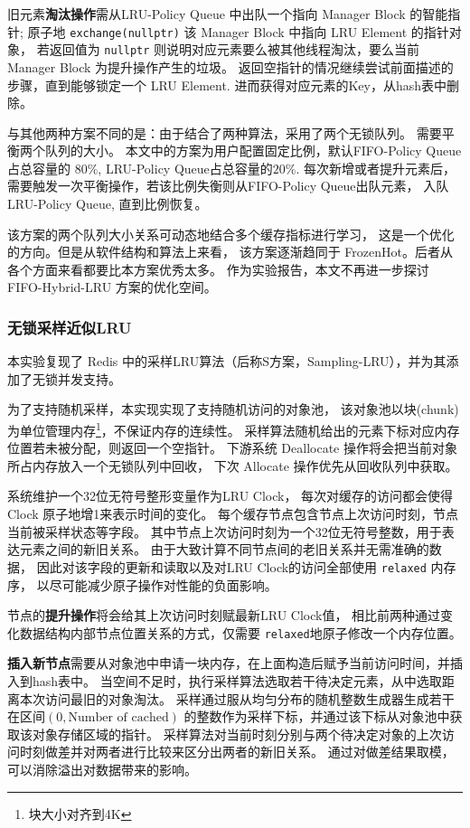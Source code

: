 旧元素\textbf{淘汰操作}需从LRU-Policy Queue 中出队一个指向 Manager Block 的智能指针;
原子地 \verb|exchange(nullptr)| 该 Manager Block 中指向 LRU Element 的指针对象，
若返回值为 \verb|nullptr| 则说明对应元素要么被其他线程淘汰，要么当前 Manager Block 为提升操作产生的垃圾。
返回空指针的情况继续尝试前面描述的步骤，直到能够锁定一个 LRU Element.
进而获得对应元素的Key，从hash表中删除。

与其他两种方案不同的是：由于结合了两种算法，采用了两个无锁队列。
需要平衡两个队列的大小。
本文中的方案为用户配置固定比例，默认FIFO-Policy Queue占总容量的 $80\%$,
LRU-Policy Queue占总容量的$20\%$. 每次新增或者提升元素后，
需要触发一次平衡操作，若该比例失衡则从FIFO-Policy Queue出队元素，
入队LRU-Policy Queue, 直到比例恢复。

该方案的两个队列大小关系可动态地结合多个缓存指标进行学习，
这是一个优化的方向。但是从软件结构和算法上来看，
该方案逐渐趋同于 FrozenHot。后者从各个方面来看都要比本方案优秀太多。
作为实验报告，本文不再进一步探讨 FIFO-Hybrid-LRU 方案的优化空间。

\subsubsection{无锁采样近似LRU}

本实验复现了 Redis 中的采样LRU算法（后称S方案，Sampling-LRU），并为其添加了无锁并发支持。

为了支持随机采样，本实现实现了支持随机访问的对象池，
该对象池以块(chunk)为单位管理内存\footnote{块大小对齐到4K}，不保证内存的连续性。
采样算法随机给出的元素下标对应内存位置若未被分配，则返回一个空指针。
下游系统 Deallocate 操作将会把当前对象所占内存放入一个无锁队列中回收，
下次 Allocate 操作优先从回收队列中获取。

系统维护一个32位无符号整形变量作为LRU Clock，
每次对缓存的访问都会使得Clock 原子地增1来表示时间的变化。
每个缓存节点包含节点上次访问时刻，节点当前被采样状态等字段。
其中节点上次访问时刻为一个32位无符号整数，用于表达元素之间的新旧关系。
由于大致计算不同节点间的老旧关系并无需准确的数据，
因此对该字段的更新和读取以及对LRU Clock的访问全部使用 \verb|relaxed| 内存序，
以尽可能减少原子操作对性能的负面影响。

节点的\textbf{提升操作}将会给其上次访问时刻赋最新LRU Clock值，
相比前两种通过变化数据结构内部节点位置关系的方式，仅需要 \verb|relaxed|地原子修改一个内存位置。

\textbf{插入新节点}需要从对象池中申请一块内存，在上面构造后赋予当前访问时间，并插入到hash表中。
当空间不足时，执行采样算法选取若干待决定元素，从中选取距离本次访问最旧的对象淘汰。
采样通过服从均匀分布的随机整数生成器生成若干在区间$\allowbreak (0, \mbox{Number of cached})$
的整数作为采样下标，并通过该下标从对象池中获取该对象存储区域的指针。
采样算法对当前时刻分别与两个待决定对象的上次访问时刻做差并对两者进行比较来区分出两者的新旧关系。
通过对做差结果取模，可以消除溢出对数据带来的影响。

